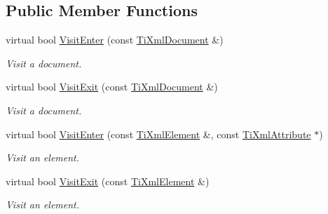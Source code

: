 \subsection*{Public Member Functions}
\begin{DoxyCompactItemize}
\item 
\mbox{\label{classTiXmlVisitor_a07baecb52dd7d8716ae2a48ad0956ee0}} 
virtual bool \hyperlink{classTiXmlVisitor_a07baecb52dd7d8716ae2a48ad0956ee0}{Visit\+Enter} (const \hyperlink{classTiXmlDocument}{Ti\+Xml\+Document} \&)
\begin{DoxyCompactList}\small\item\em Visit a document. \end{DoxyCompactList}\item 
\mbox{\label{classTiXmlVisitor_aa0ade4f27087447e93974e975c3246ad}} 
virtual bool \hyperlink{classTiXmlVisitor_aa0ade4f27087447e93974e975c3246ad}{Visit\+Exit} (const \hyperlink{classTiXmlDocument}{Ti\+Xml\+Document} \&)
\begin{DoxyCompactList}\small\item\em Visit a document. \end{DoxyCompactList}\item 
\mbox{\label{classTiXmlVisitor_af6c6178ffa517bbdba95d70490875fff}} 
virtual bool \hyperlink{classTiXmlVisitor_af6c6178ffa517bbdba95d70490875fff}{Visit\+Enter} (const \hyperlink{classTiXmlElement}{Ti\+Xml\+Element} \&, const \hyperlink{classTiXmlAttribute}{Ti\+Xml\+Attribute} $\ast$)
\begin{DoxyCompactList}\small\item\em Visit an element. \end{DoxyCompactList}\item 
\mbox{\label{classTiXmlVisitor_aec2b1f8116226d52f3a1b95dafd3a32c}} 
virtual bool \hyperlink{classTiXmlVisitor_aec2b1f8116226d52f3a1b95dafd3a32c}{Visit\+Exit} (const \hyperlink{classTiXmlElement}{Ti\+Xml\+Element} \&)
\begin{DoxyCompactList}\small\item\em Visit an element. \end{DoxyCompactList}\item 
\mbox{\label{classTiXmlVisitor_afad71c71ce6473fb9b4b64cd92de4a19}} 

\end{DoxyCompactItemize}
